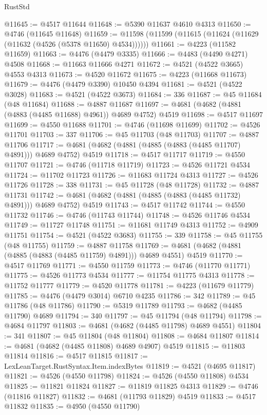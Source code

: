 \begin{lexlean}{RustStd}
\begin{coremodule}
@11645 := @4517 @11644
@11648 := @5390 @11637 @4610 @4313
@11650 := @4746 (@11645 @11648)
@11659 := @11598 (@11599 (@11615 (@11624 (@11629 (@11632 (@4526 (@5378 @11650) @4534))))))
@11661 := @4223 (@11582 @11659)
@11663 := @4476 (@4479 @3335)
@11666 := @4483 (@4490 @4271) @4508
@11668 := @11663 @11666 @4271
@11672 := @4521 (@4522 @3665) @4553 @4313
@11673 := @4520 @11672
@11675 := @4223 (@11668 @11673)
@11679 := @4476 (@4479 @3390) @10450 @4394
@11681 := @4521 (@4522 @3028)
@11683 := @4521 (@4522 @3673)
@11684 := 336
@11687 := @45 @11684 (@48 @11684)
@11688 := @4887 @11687
@11697 := @4681 (@4682 (@4881 (@4883 (@4485 @11688) @4961)) @4689 @4752) @4519
@11698 := @4517 @11697
@11699 := @4550 @11688
@11701 := @4746 (@11698 @11699)
@11702 := @4526 @11701
@11703 := 337
@11706 := @45 @11703 (@48 @11703)
@11707 := @4887 @11706
@11717 := @4681 (@4682 (@4881 (@4885 (@4883 (@4485 @11707) @4891))) @4689 @4752) @4519
@11718 := @4517 @11717
@11719 := @4550 @11707
@11721 := @4746 (@11718 @11719)
@11723 := @4526 @11721 @4534
@11724 := @11702 @11723
@11726 := @11683 @11724 @4313
@11727 := @4526 @11726
@11728 := 338
@11731 := @45 @11728 (@48 @11728)
@11732 := @4887 @11731
@11742 := @4681 (@4682 (@4881 (@4885 (@4883 (@4485 @11732) @4891))) @4689 @4752) @4519
@11743 := @4517 @11742
@11744 := @4550 @11732
@11746 := @4746 (@11743 @11744)
@11748 := @4526 @11746 @4534
@11749 := @11727 @11748
@11751 := @11681 @11749 @4313
@11752 := @4909 @11751
@11754 := @4521 (@4522 @3683)
@11755 := 339
@11758 := @45 @11755 (@48 @11755)
@11759 := @4887 @11758
@11769 := @4681 (@4682 (@4881 (@4885 (@4883 (@4485 @11759) @4891))) @4689 @4551) @4519
@11770 := @4517 @11769
@11771 := @4550 @11759
@11773 := @4746 (@11770 @11771)
@11775 := @4526 @11773 @4534
@11777 := @11754 @11775 @4313
@11778 := @11752 @11777
@11779 := @4520 @11778
@11781 := @4223 (@11679 @11779)
@11785 := @4476 (@4479 @3014) @6710 @4235
@11786 := 342
@11789 := @45 @11786 (@48 @11786)
@11790 := @5319 @11789
@11793 := @4682 (@4485 @11790) @4689
@11794 := 340
@11797 := @45 @11794 (@48 @11794)
@11798 := @4684 @11797
@11803 := @4681 (@4682 (@4485 @11798) @4689 @4551)
@11804 := 341
@11807 := @45 @11804 (@48 @11804)
@11808 := @4684 @11807
@11814 := @4681 (@4682 (@4485 @11808) @4689 @4907) @4519
@11815 := @11803 @11814
@11816 := @4517 @11815
@11817 := LexLeanTarget.RustSyntax.Item.indexBytes
@11819 := @4521 (@4695 @11817)
@11821 := @4526 (@4550 @11798)
@11824 := @4526 (@4550 @11808) @4534
@11825 := @11821 @11824
@11827 := @11819 @11825 @4313
@11829 := @4746 (@11816 @11827)
@11832 := @4681 (@11793 @11829) @4519
@11833 := @4517 @11832
@11835 := @4950 (@4550 @11790)

\end{coremodule}
\end{lexlean}
